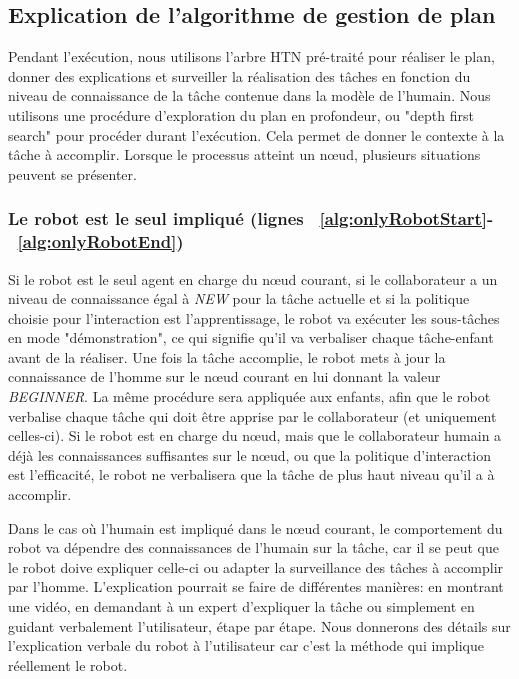 \documentclass[a4paper,11pt,twoside]{StyleThese}
\begin{document}
\subsection{Explication de l'algorithme de gestion de plan}
Pendant l'exécution, nous utilisons l'arbre HTN pré-traité pour réaliser le plan, donner des explications et surveiller la réalisation des tâches en fonction du niveau de connaissance de la tâche contenue dans la modèle de l'humain.
Nous utilisons une procédure d'exploration du plan en profondeur, ou "depth first search" pour procéder durant l'exécution. Cela permet de donner le contexte à la tâche à accomplir.
Lorsque le processus atteint un nœud, plusieurs situations peuvent se présenter.

\subsubsection{Le robot est le seul impliqué (lignes ~\ref{alg:onlyRobotStart}-~\ref{alg:onlyRobotEnd})} Si le robot est le seul agent en charge du nœud courant, si le collaborateur a un niveau de connaissance égal à \textit{NEW} pour la tâche actuelle et si la politique choisie pour l'interaction est l'apprentissage, le robot va exécuter les sous-tâches en mode "démonstration", ce qui signifie qu'il va verbaliser chaque tâche-enfant avant de la réaliser. Une fois la tâche accomplie, le robot mets à jour la connaissance de l'homme sur le nœud courant en lui donnant la valeur \textit{BEGINNER}. La même procédure sera appliquée aux enfants, afin que le robot verbalise chaque tâche qui doit être apprise par le collaborateur (et uniquement celles-ci).
Si le robot est en charge du nœud, mais que le collaborateur humain a déjà les connaissances suffisantes sur le nœud, ou que la politique d'interaction est l'efficacité, le robot ne verbalisera que la tâche de plus haut niveau qu'il a à accomplir.

Dans le cas où l'humain est impliqué dans le nœud courant, le comportement du robot va dépendre des connaissances de l'humain sur la tâche, car il se peut que le robot doive expliquer celle-ci ou adapter la surveillance des tâches à accomplir par l'homme.
L'explication pourrait se faire de différentes manières: en montrant une vidéo, en demandant à un expert d'expliquer la tâche ou simplement en guidant verbalement l'utilisateur, étape par étape. Nous donnerons des détails sur l'explication verbale du robot à l'utilisateur car c'est la méthode qui implique réellement le robot.
\end{document}
